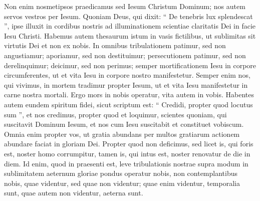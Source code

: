 \begin{biblechapter}
\begin{biblechapter}
\begin{biblechapter}
\begin{biblechapter}
\verse Non enim nosmetipsos praedicamus sed Iesum Christum Dominum; nos autem servos vestros per Iesum. 
\verse Quoniam Deus, qui dixit: “ De tenebris lux splendescat ”, ipse illuxit in cordibus nostris ad illuminationem scientiae claritatis Dei in facie Iesu Christi.
 \verse Habemus autem thesaurum istum in vasis fictilibus, ut sublimitas sit virtutis Dei et non ex nobis. 
\verse In omnibus tribulationem patimur, sed non angustiamur; aporiamur, sed non destituimur; 
\verse persecutionem patimur, sed non derelinquimur; deicimur, sed non perimus; 
\verse semper mortificationem Iesu in corpore circumferentes, ut et vita Iesu in corpore nostro manifestetur. 
 \verse Semper enim nos, qui vivimus, in mortem tradimur propter Iesum, ut et vita Iesu manifestetur in carne nostra mortali. 
\verse Ergo mors in nobis operatur, vita autem in vobis.
 \verse Habentes autem eundem spiritum fidei, sicut scriptum est: “ Credidi, propter quod locutus sum ”, et nos credimus, propter quod et loquimur, 
\verse scientes quoniam, qui suscitavit Dominum Iesum, et nos cum Iesu suscitabit et constituet vobiscum. 
\verse Omnia enim propter vos, ut gratia abundans per multos gratiarum actionem abundare faciat in gloriam Dei. 
\verse Propter quod non deficimus, sed licet is, qui foris est, noster homo corrumpitur, tamen is, qui intus est, noster renovatur de die in diem. 
\verse Id enim, quod in praesenti est, leve tribulationis nostrae supra modum in sublimitatem aeternum gloriae pondus operatur nobis, 
\verse non contemplantibus nobis, quae videntur, sed quae non videntur; quae enim videntur, temporalia sunt, quae autem non videntur, aeterna sunt.
 

\end{biblechapter}
\end{biblechapter}
\end{biblechapter}
\end{biblechapter}
